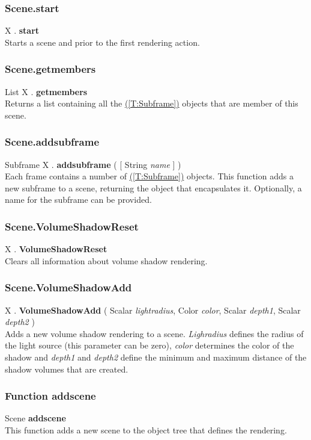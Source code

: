 \documentclass[10pt]{book}
\newcommand{\linkitem}[1]{\hyperref[#1]{\nameref{#1} (\ref{#1})}}
\newcommand{\var}[1]{\textit{#1}}
\begin{document}
\subsubsection{Scene.start \label{F:Scene:start}}
X . \textbf{start} \\
Starts a scene and prior to the first rendering action.

\subsubsection{Scene.getmembers \label{F:Scene:getmembers}}
List X . \textbf{getmembers} \\
Returns a list containing all the \linkitem{T:Subframe} objects that are member of this scene.

\subsubsection{Scene.addsubframe \label{F:Scene:addsubframe}}
Subframe X . \textbf{addsubframe} (  [ String \textit{name} ] ) \\
Each frame contains a number of \linkitem{T:Subframe} objects. This function adds a new subframe to a scene, returning the object that encapsulates it. Optionally, a name for the subframe can be provided.

\subsubsection{Scene.VolumeShadowReset \label{F:Scene:VolumeShadowReset}}
X . \textbf{VolumeShadowReset} \\
Clears all information about volume shadow rendering.

\subsubsection{Scene.VolumeShadowAdd \label{F:Scene:VolumeShadowAdd}}
X . \textbf{VolumeShadowAdd} ( Scalar \textit{lightradius}, Color \textit{color}, Scalar \textit{depth1}, Scalar \textit{depth2} ) \\
Adds a new volume shadow rendering to a scene. \var{Lighradius} defines the radius of the light source (this parameter can  be zero), \var{color} determines the color of the shadow and \var{depth1} and \var{depth2} define the minimum and maximum distance of the shadow volumes that are created.

\subsubsection{Function addscene \label{F:addscene}}
Scene \textbf{addscene} \\
This function adds a new scene to the object tree that defines the rendering.
\end{document}
